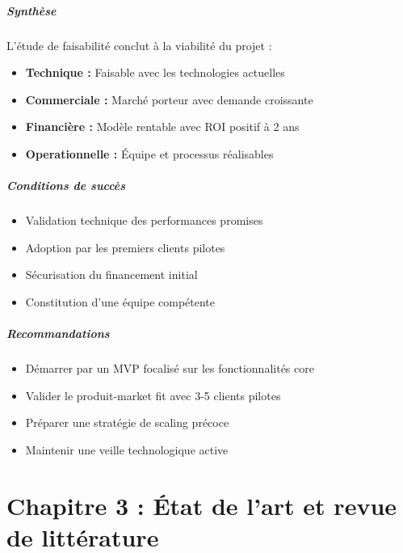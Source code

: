 \documentclass[12pt,a4paper]{report}
\begin{document}
\subsubsection{Synthèse}

L'étude de faisabilité conclut à la viabilité du projet :
\begin{itemize}
\item \textbf{Technique :} Faisable avec les technologies actuelles
\item \textbf{Commerciale :} Marché porteur avec demande croissante
\item \textbf{Financière :} Modèle rentable avec ROI positif à 2 ans
\item \textbf{Operationnelle :} Équipe et processus réalisables
\end{itemize}

\subsubsection{Conditions de succès}

\begin{itemize}
\item Validation technique des performances promises
\item Adoption par les premiers clients pilotes
\item Sécurisation du financement initial
\item Constitution d'une équipe compétente
\end{itemize}

\subsubsection{Recommandations}

\begin{itemize}
\item Démarrer par un MVP focalisé sur les fonctionnalités core
\item Valider le produit-market fit avec 3-5 clients pilotes
\item Préparer une stratégie de scaling précoce
\item Maintenir une veille technologique active
\end{itemize}

\part{Chapitre 3 : État de l'art et revue de littérature}
\label{part:etat-art}
\end{document}
